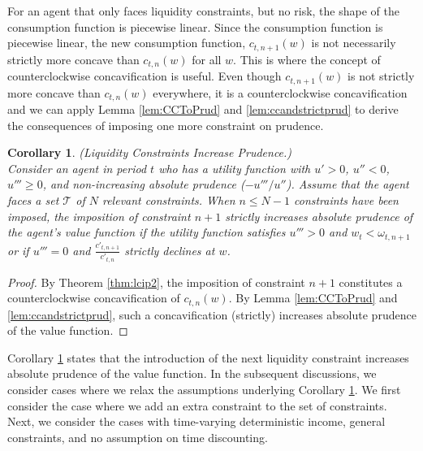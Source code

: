 \documentclass[titlepage]{\econtex}
\providecommand{\wAlt}{\omega}
\newtheorem{corollary}{Corollary}
\begin{document}
  For an agent that only faces liquidity constraints, but no risk, the shape of the consumption function is piecewise linear. 
  Since the consumption function is piecewise linear, the new consumption function, $c_{t,n+1}(w)$ is not necessarily strictly more concave than $c_{t,n}(w)$ for all $w$. This is where the concept of counterclockwise concavification is useful. Even though $c_{t,n+1}(w)$ is not strictly more concave than $c_{t,n}(w)$ everywhere, it is a counterclockwise concavification and we can apply Lemma \ref{lem:CCToPrud} and \ref{lem:ccandstrictprud} to derive the consequences of imposing one more constraint on prudence.

  \begin{corollary}\label{cor:lcip} (Liquidity Constraints Increase Prudence.) \\
    Consider an agent in period $t$ who has a utility function with $u' > 0$, $u'' < 0$, $u''' \geq 0$, and non-increasing absolute prudence ($-u'''/u''$). Assume that the agent faces a set $\mathcal{T}$ of $N$ relevant constraints. When $n \leq N-1$ constraints have been imposed, the imposition of constraint $n+1$ strictly increases absolute prudence of the agent's value function if the utility function satisfies $u''' > 0$ and $w_t < \wAlt_{t,n+1}$ or if $u''' = 0$ and $\frac{c'_{t,n+1}}{c'_{t,n}}$ strictly declines at $w$.
  \end{corollary}
  \begin{proof}
    By Theorem \ref{thm:lcip2}, the imposition of constraint $n+1$ constitutes a counterclockwise concavification of $c_{t,n}(w)$. By Lemma \ref{lem:CCToPrud} and \ref{lem:ccandstrictprud}, such a concavification (strictly) increases absolute prudence of the value function.
  \end{proof}

  \noindent Corollary \ref{cor:lcip} states that the introduction of the next liquidity constraint increases absolute prudence of the value function. In the subsequent discussions, we consider cases where we relax the assumptions underlying Corollary \ref{cor:lcip}. We first consider the case where we add an extra constraint to the set of constraints. Next, we consider the cases with time-varying deterministic income, general constraints, and no assumption on time discounting.
\end{document}
